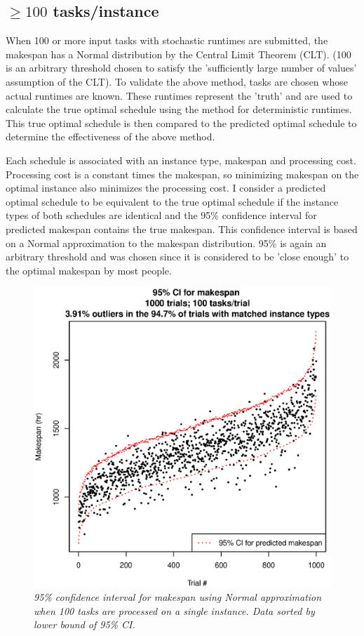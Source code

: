 \documentclass[12pt]{report}
\begin{document}
\subsection{$\geq 100$ tasks/instance}

When 100 or more input tasks with stochastic runtimes are submitted, the makespan has a Normal distribution by the Central Limit Theorem (CLT).
(100 is an arbitrary threshold chosen to satisfy the 'sufficiently large number of values' assumption of the CLT).
To validate the above method, tasks are chosen whose actual runtimes are known.
These runtimes represent the 'truth' and are used to calculate the true optimal schedule using the method for deterministic runtimes. 
This true optimal schedule is then compared to the predicted optimal schedule to determine the effectiveness of the above method. 

Each schedule is associated with an instance type, makespan and processing cost. 
Processing cost is a constant times the makespan, so minimizing makespan on the optimal instance also minimizes the processing cost.
I consider a predicted optimal schedule to be equivalent to the true optimal schedule if the instance types of both schedules are identical and the 95\% confidence interval for predicted makespan contains the true makespan.
This confidence interval is based on a Normal approximation to the makespan distribution.
95\% is again an arbitrary threshold and was chosen since it is considered to be 'close enough' to the optimal makespan by most people.

\begin{figure}
\includegraphics[width=1\textwidth]{validate-stochastic-runtimes-1000-trials-100-tasks.eps}
\caption{\textit{95\% confidence interval for makespan using Normal approximation when 100 tasks are processed on a single instance. Data sorted by lower bound of 95\% CI.}}
\label{fig:validate-stochastic-runtimes-1000-trials-100-tasks}
\end{figure}
\end{document}
